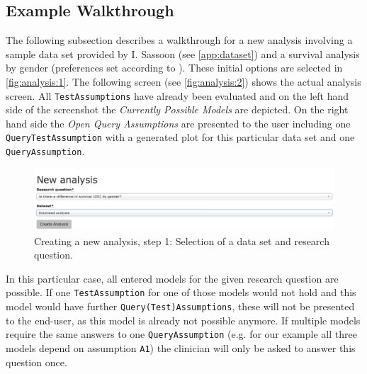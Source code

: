 \subsection{Example Walkthrough}
\label{sub:walk}

The following subsection describes a walkthrough for a new analysis involving a sample data set provided by I. Sassoon (see \autoref{app:dataset}) and a survival analysis by gender (preferences set according to \cite{sassoon2016CD}). These initial options are selected in \autoref{fig:analysis:1}. The following screen (see \autoref{fig:analysis:2}) shows the actual analysis screen. All \texttt{TestAssumptions} have already been evaluated and on the left hand side of the screenshot the \textit{Currently Possible Models} are depicted. On the right hand side the \textit{Open Query Assumptions} are presented to the user including one \texttt{QueryTestAssumption} with a generated plot for this particular data set and one \texttt{QueryAssumption}. 

\begin{figure}[h]
	\centering
	\includegraphics[width=\textwidth]{figures/ui_analysis_0}
	\caption{Creating a new analysis, step 1: Selection of a data set and research question. }
	\label{fig:analysis:1}
\end{figure}

In this particular case, all entered models for the given research question are possible. If one \texttt{TestAssumption} for one of those models would not hold and this model would have further \texttt{Query(Test)Assumptions}, these will not be presented to the end-user, as this model is already not possible anymore. If multiple models require the same answers to one \texttt{QueryAssumption} (e.g. for our example all three models depend on assumption \texttt{A1}) the clinician will only be asked to answer this question once. 

